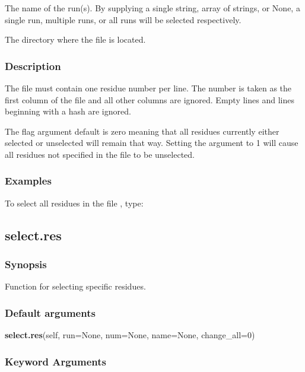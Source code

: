   The name of the run(s).  By supplying a single string, array of strings, or None, a single run, multiple runs, or all runs will be selected respectively.

  The directory where the file is located.


\subsubsection{Description}

The file must contain one residue number per line.  The number is taken as the first column
of the file and all other columns are ignored.  Empty lines and lines beginning with a hash
are ignored.

The 
 flag argument default is zero meaning that all residues currently either
selected or unselected will remain that way.  Setting the argument to 1 will cause all
residues not specified in the file to be unselected.


\subsubsection{Examples}

To select all residues in the file 
, type:





\newpage

\subsection{select.res}


\subsubsection{Synopsis}

Function for selecting specific residues.

\subsubsection{Default arguments}

\textsf{\textbf{select.res}(self, run=None, num=None, name=None, change\_all=0)}


\subsubsection{Keyword Arguments}

